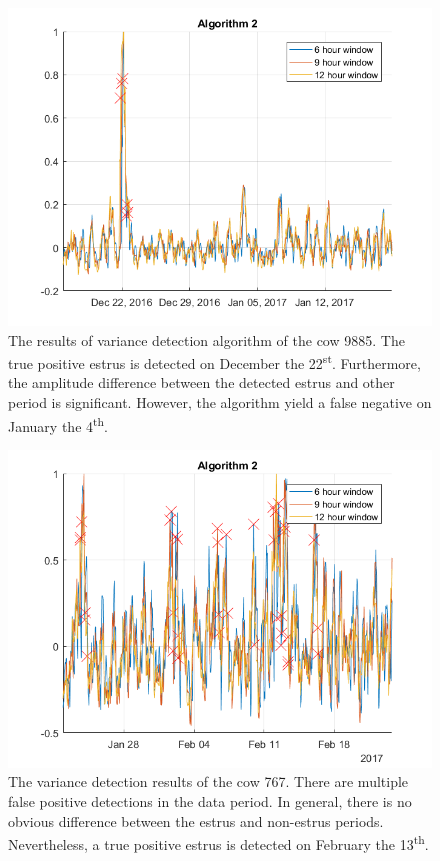 \documentclass[english,12pt,a4paper,pdftex,elec,utf8]{aaltothesis}
\begin{document}
\begin{figure}[htb]
\centering
\includegraphics[width = 0.75 \textwidth]{figures/algorithm2_cow9885.png}
\caption{The results of variance detection algorithm of the cow 9885. The true positive estrus is detected on December the 22\textsuperscript{st}. Furthermore, the amplitude difference between the detected estrus and other period is significant. However, the algorithm yield a false negative on January the 4\textsuperscript{th}.}
\end{figure}

\begin{figure}[htb]
\centering
\includegraphics[width = 0.75 \textwidth]{figures/algorithm2_cow767}
\caption{The variance detection results of the cow 767. There are multiple false positive detections in the data period. In general, there is no obvious difference between the estrus and non-estrus periods. Nevertheless, a true positive estrus is detected on February the 13\textsuperscript{th}.}
\end{figure}
\end{document}
